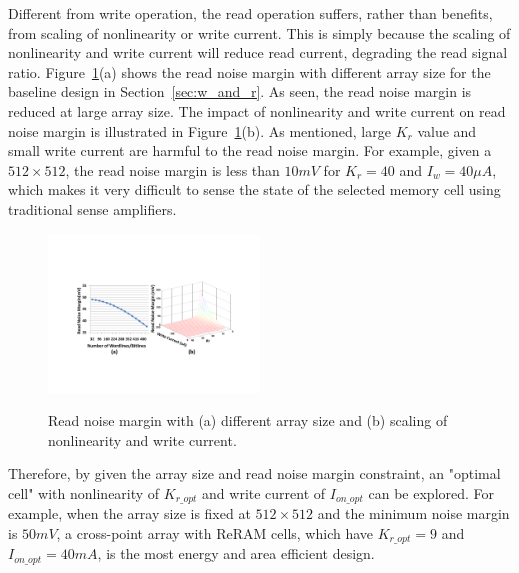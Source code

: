 Different from write operation, the read operation suffers, rather than
benefits, from scaling of nonlinearity or write current. This is simply
because the scaling of nonlinearity and write current will reduce read
current, degrading the read signal ratio. Figure~\ref{fig:sense_margin}(a)
shows the read noise margin with different array size for the baseline
design in Section~\ref{sec:w_and_r}.  As seen, the read noise margin is
reduced at large array size. The impact of nonlinearity and write current
on read noise margin is illustrated in Figure~\ref{fig:sense_margin}(b).
As mentioned, large $K_r$ value and small write current are harmful to the
read noise margin. For example, given a $512 \times 512$, the read noise
margin is less than $10mV$ for $K_r=40$ and $I_w=40\mu A$, which makes it
very difficult to sense the state of the selected memory cell using
traditional sense amplifiers.

\begin{figure}[!t]
\centering
  \includegraphics[width=0.5\textwidth]{./figures/read}\\
  \caption{Read noise margin with (a) different array size and (b) scaling of nonlinearity and write current.}\label{fig:sense_margin}
  \vspace{-15pt}
\end{figure}

Therefore, by given the array size and read noise margin constraint, an
"optimal cell" with nonlinearity of $K_{r\_opt}$ and write current of
$I_{on\_opt}$ can be explored. For example, when the array size is fixed
at $512 \times 512$ and the minimum noise margin is $50mV$, a cross-point
array with ReRAM cells, which have $K_{r\_opt} = 9$ and $I_{on\_opt} =
40mA$, is the most energy and area efficient design.


